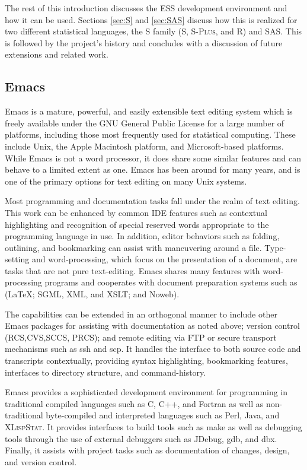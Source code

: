 \documentclass{article}
\newcommand*{\Splus}{\textsc{S-Plus}}
\newcommand*{\XLispStat}{\textsc{XLispStat}}
\begin{document}
The rest of this introduction discusses the ESS development
environment and how it can be used.  Sections \ref{sec:S} and
\ref{sec:SAS} discuss how this is realized for two different
statistical languages, the S family (S, \Splus, and R)
and SAS.  This is followed by the project's history and concludes
with a discussion of future extensions and related work.

\subsection{Emacs}
\label{sec:intro:emacs}

Emacs \citep{RMS:2000} is a mature, powerful, and easily extensible
text editing system which is freely available under the GNU General Public
License for a large number of platforms, including those
most frequently used for statistical computing.  These include Unix,
the Apple
Macintosh platform, and Microsoft-based
platforms.  While Emacs is not a word processor, it does share some
similar features and can behave to a limited extent as one.  Emacs has
been around for many years, and is one of
the primary options for text editing on many Unix systems.

Most programming and documentation tasks fall under the realm of text
editing.  This work can be enhanced by common IDE features such as
contextual highlighting and recognition of special reserved words appropriate to
the programming language in use.  In addition, editor behaviors
such as folding, outlining, and bookmarking can assist with
maneuvering around a file.  
Type-setting and word-processing, which focus on the presentation of a
document, are tasks that are not pure text-editing.  Emacs 
shares many features with word-processing programs and cooperates with 
document preparation systems such as  (\LaTeX; SGML, XML, and XSLT; and Noweb).

The capabilities can be extended
in an orthogonal manner to include other Emacs packages for assisting
with documentation as noted above; version
control (RCS,CVS,SCCS, PRCS); and remote editing via FTP or secure
transport mechanisms such as ssh and scp.  It handles the interface to
both source code and transcripts contextually, providing syntax
highlighting, bookmarking features, interfaces to directory structure,
and command-history.

Emacs provides a sophisticated development environment for programming
in traditional compiled languages such as C, C++, and Fortran as well
as non-traditional byte-compiled and interpreted languages such as
Perl, Java, and \XLispStat.  It provides interfaces to build tools such as
make as well as debugging tools through the use of external debuggers
such as JDebug, gdb, and dbx.  Finally, it assists with project tasks
such as documentation of changes, design, and version control.
\end{document}
